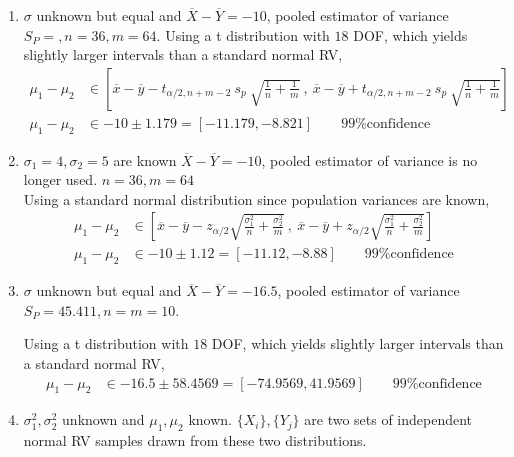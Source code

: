 \begin{enumerate}
	\item  $ \sigma $ unknown but equal and $ \overline{X} - \overline{Y} = -10 $, pooled estimator of variance $ S_P = , n = 36, m = 64$.
	Using a t distribution with $ 18 $ DOF, which yields slightly larger intervals than a standard normal RV,
	\begin{subequations}
		\begin{align}
			\mu_1 - \mu_2 &\in \left[ \overline{x} - \overline{y} - t_{\alpha / 2, n+m-2}\ s_p\ \sqrt{\frac{1}{n} + \frac{1}{m}}\ ,\ \overline{x} - \overline{y} + t_{\alpha / 2, n+m-2}\ s_p\ \sqrt{\frac{1}{n} + \frac{1}{m}} \right]  \nonumber \\
			\mu_1 - \mu_2 &\in -10 \pm 1.179 = [-11.179, -8.821] \qquad \text{99\% confidence}  
		\end{align}
	\end{subequations}
	
	\item  $ \sigma_1 = 4, \sigma_2 = 5 $ are known  $ \overline{X} - \overline{Y} = -10 $, pooled estimator of variance is no longer used. $n = 36, m = 64$ \\
	Using a standard normal distribution since population variances are known,
	\begin{subequations}
		\begin{align}
			\mu_1 - \mu_2 &\in \left[ \overline{x} - \overline{y} - z_{\alpha / 2} \sqrt{\frac{\sigma_1^2}{n} + \frac{\sigma_2^2}{m}}\ ,\ \overline{x} - \overline{y} + z_{\alpha / 2} \sqrt{\frac{\sigma_1^2}{n} + \frac{\sigma_2^2}{m}} \right]   \nonumber \\
			\mu_1 - \mu_2 &\in -10 \pm 1.12 = [-11.12, -8.88] \qquad \text{99\% confidence}  
		\end{align}
	\end{subequations}


	\item  $ \sigma $ unknown but equal and $ \overline{X} - \overline{Y} = -16.5 $, pooled estimator of variance $ S_P = 45.411, n = m = 10$.
	
	Using a t distribution with $ 18 $ DOF, which yields slightly larger intervals than a standard normal RV,
	\begin{subequations}
		\begin{align}		
			\mu_1 - \mu_2 &\in -16.5 \pm 58.4569 = [-74.9569, 41.9569] \qquad \text{99\% confidence}
		\end{align}
	\end{subequations}

	\item  $ \sigma_1^2, \sigma_2^2 $ unknown and $ \mu_1, \mu_2 $ known. $ \{X_i\}, \{Y_j\} $ are two sets of independent normal RV samples drawn from these two distributions.
	

\end{enumerate}
